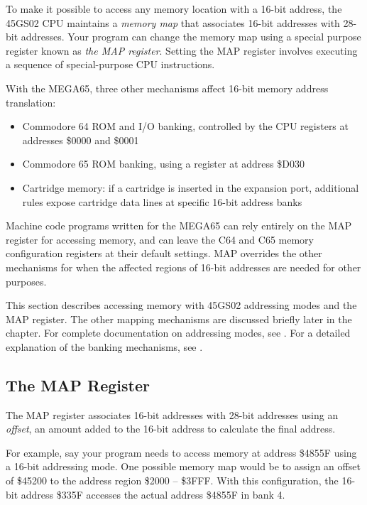 To make it possible to access any memory location with a 16-bit address, the
45GS02 CPU maintains a {\em memory map} that associates 16-bit addresses with
28-bit addresses. Your program can change the memory map using a special
purpose register known as {\em the MAP register}. Setting the MAP register
involves executing a sequence of special-purpose CPU instructions.

With the MEGA65, three other mechanisms affect 16-bit memory address
translation:

\begin{itemize}
\item Commodore 64 ROM and I/O banking, controlled by the CPU registers at addresses \$0000 and \$0001
\item Commodore 65 ROM banking, using a register at address \$D030
\item Cartridge memory: if a cartridge is inserted in the expansion port, additional rules expose cartridge data lines at specific 16-bit address banks
\end{itemize}

Machine code programs written for the MEGA65 can rely entirely on the MAP
register for accessing memory, and can leave the C64 and C65 memory
configuration registers at their default settings. MAP overrides the other
mechanisms for when the affected regions of 16-bit addresses are needed for
other purposes.

This section describes accessing memory with 45GS02 addressing modes and the
MAP register. The other mapping mechanisms are discussed briefly later in the
chapter. For complete documentation on addressing modes, see
. For a detailed explanation of the banking
mechanisms, see .

\subsection{The MAP Register}

The MAP register associates 16-bit addresses with 28-bit addresses using an
{\em offset}, an amount added to the 16-bit address to calculate the final
address.

For example, say your program needs to access memory at address \$4855F using
a 16-bit addressing mode. One possible memory map would be to assign an offset
of \$45200 to the address region \$2000 -- \$3FFF. With this configuration,
the 16-bit address \$335F accesses the actual address \$4855F in bank 4.


